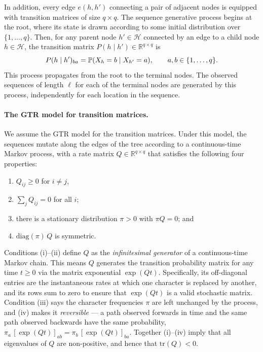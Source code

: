 In addition, every edge $e(h, h')$ connecting a pair of adjacent nodes is equipped with transition matrices of size $q \times q$. The sequence generative process begins at the root, where its state is drawn according to some initial distribution over $\{1, \ldots, q\}$. Then, for any parent node $h' \in \mathcal{H}$ connected by an edge to a child node $h \in \mathcal{H}$, the transition matrix $P(h \mid h') \in \mathbb{R}^{q \times q}$ is 
\begin{equation}
    P(h \mid h')_{ba} = \mathbb{P}(X_{h} = b \mid X_{h'} = a), \qquad a, b \in \{1, \ldots, q\}.
    \label{eq:P_h_htag}
\end{equation}
This process propagates from the root to the terminal nodes. The observed sequences of length $\ell$ for each of the terminal nodes are generated by this process, independently for each location in the sequence.


\paragraph{The GTR model for transition matrices.}
We assume the GTR model for the transition matrices. 
Under this model, the sequences mutate along the edges of the tree according to a continuous-time Markov process, with a rate matrix $Q\in \mathbb{R}^{q\times q}$ that satisfies the following four properties:


\begin{enumerate}[label=(\roman*), leftmargin=2.2em, itemsep=1pt, topsep=3pt]
\item $Q_{ij}\ge0$ for $i\ne j$,
\item $\sum_j Q_{ij}=0$ for all $i$;
\item there is a stationary distribution $\pi>0$ with $\pi Q=0$; and
\item $\mathrm{diag}(\pi)\,Q$ is symmetric.
\end{enumerate}
Conditions (i)--(ii) define $Q$ as the \emph{infinitesimal generator} of a continuous-time Markov chain. This means $Q$ generates the transition probability matrix for any time $t\ge0$ via the matrix exponential $\exp(Qt)$. Specifically, its off-diagonal entries are the instantaneous rates at which one character is replaced by another, and its rows sum to zero to ensure that $\exp(Qt)$ is a valid stochastic matrix. Condition (iii) says the character frequencies $\pi$ are left unchanged by the process, and (iv) makes it \emph{reversible} --- a path observed forwards in time and the same path observed backwards have the same probability, $\pi_a\,[\exp(Qt)]_{ab}=\pi_b\,[\exp(Qt)]_{ba}$. Together (i)--(iv) imply that all eigenvalues of $Q$ are non-positive, and hence that $\mathrm{tr}(Q)<0$.

